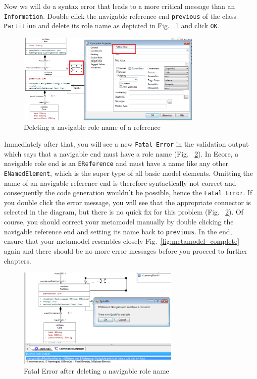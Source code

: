 Now we will do a syntax error that leads to a more critical message than an
\texttt{Information}. Double click the navigable reference end \texttt{previous}
of the class \texttt{Partition} and delete its role name as depicted in Fig.
~\ref{fig:delete-role-name} and click \texttt{OK}.

\begin{figure}[htbp]
	\centering
  \includegraphics[width=0.8\textwidth]{pics/memBoxBilder/memBox46} 
	\caption{Deleting a navigable role name of a reference}
	\label{fig:delete-role-name}
\end{figure}

Immediately after that, you will see a new \texttt{Fatal Error} in the
validation output which says that a navigable end must have a role name (Fig.
~\ref{fig:fatal-error}).
In Ecore, a navigable role end is an \texttt{EReference} and must have a name like any other
\texttt{ENamedElement}, which is the super type of all basic model elements.
Omitting the name of an navigable reference end is therefore syntactically not
correct and consequently the code generation wouldn't be possible, hence the \texttt{Fatal Error}. If you
double click the error message, you will see that the appropriate connector is
selected in the diagram, but there is no quick fix for this problem (Fig.
~\ref{fig:fatal-error}). Of course, you should correct your metamodel manually
by double clicking the navigable reference end and setting its name back to
\texttt{previous}. In the end, ensure that your metamodel resembles closely
Fig.~\ref{fig:metamodel_complete} again and there should be no more error
messages before you proceed to further chapters.

\begin{figure}[htbp]
	\centering
  \includegraphics[width=0.7\textwidth]{pics/memBoxBilder/memBox47} 
	\caption{Fatal Error after deleting a navigable role name}
	\label{fig:fatal-error}
\end{figure}

